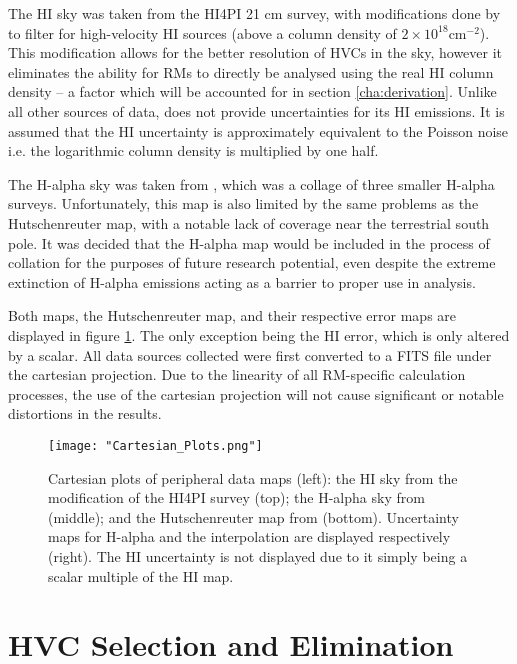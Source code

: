 The HI sky was taken from the HI4PI 21 cm survey, with modifications done by \cite{ID6} to filter for high-velocity HI sources (above a column density of $2\times 10^{18} \mathrm{cm}^{-2}$). This modification allows for the better resolution of HVCs in the sky, however it eliminates the ability for RMs to directly be analysed using the real HI column density – a factor which will be accounted for in section \ref{cha:derivation}. Unlike all other sources of data, \cite{ID6} does not provide uncertainties for its HI emissions. It is assumed that the HI uncertainty is approximately equivalent to the Poisson noise i.e. the logarithmic column density is multiplied by one half.


The H-alpha sky was taken from \cite{ID43}, which was a collage of three smaller H-alpha surveys. Unfortunately, this map is also limited by the same problems as the Hutschenreuter map, with a notable lack of coverage near the terrestrial south pole. It was decided that the H-alpha map would be included in the process of collation for the purposes of future research potential, even despite the extreme extinction of H-alpha emissions acting as a barrier to proper use in analysis.


Both maps, the Hutschenreuter map, and their respective error maps are displayed in figure \ref{fig:maps}. The only exception being the HI error, which is only altered by a scalar. All data sources collected were first converted to a FITS file under the cartesian projection. Due to the linearity of all RM-specific calculation processes, the use of the cartesian projection will not cause significant or notable distortions in the results.

\begin{figure}
    \texttt{[image: "Cartesian\_Plots.png"]}
    \centering
    \caption{Cartesian plots of peripheral data maps (left): the HI sky from the \cite{ID6} modification of the HI4PI survey (top); the H-alpha sky from \citep{ID43} (middle); and the Hutschenreuter map from \cite{ID44, ID45} (bottom). Uncertainty maps for H-alpha and the interpolation are displayed respectively (right). The HI uncertainty is not displayed due to it simply being a scalar multiple of the HI map.}
    \label{fig:maps}
\end{figure}

\section{HVC Selection and Elimination}
\label{sec:hvc_sel}

